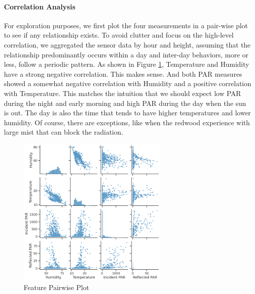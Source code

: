 \documentclass[11pt, letterpaper]{article}
\begin{document}
\paragraph{Correlation Analysis}
For exploration purposes, we first plot the four measurements in a pair-wise plot to see if any relationship exists. To avoid clutter and focus on the high-level correlation, we aggregated the sensor data by hour and height, assuming that the relationship predominantly occurs within a day and inter-day behaviors, more or less, follow a periodic pattern. As shown in Figure \ref{fig:pairwise}, Temperature and Humidity have a strong negative correlation. This makes sense. And both PAR measures showed a somewhat negative correlation with Humidity and a positive correlation with Temperature. This matches the intuition that we should expect low PAR during the night and early morning and high PAR during the day when the sun is out. The day is also the time that tends to have higher temperatures and lower humidity. Of course, there are exceptions, like when the redwood experience with large mist that can block the radiation.
\begin{figure}[h!]
\centering
\includegraphics[width=0.65\textwidth]{eda_3.1.png}
\captionsetup{justification=centering}
\caption{Feature Pairwise Plot}
\label{fig:pairwise}
\end{figure}
\end{document}
